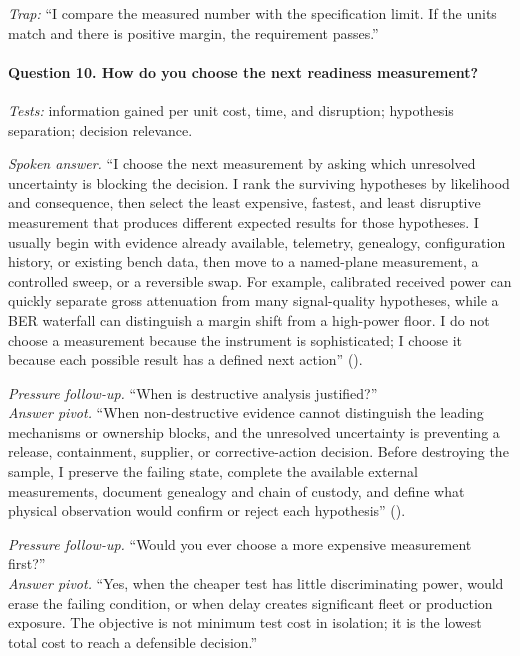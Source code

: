 \textit{Trap:} ``I compare the measured number with the specification limit. If
the units match and there is positive margin, the requirement passes.''

\paragraph{Question 10. How do you choose the next readiness measurement?}
\textit{Tests:} information gained per unit cost, time, and disruption;
hypothesis separation; decision relevance.

\textit{Spoken answer.}
``I choose the next measurement by asking which unresolved uncertainty is
blocking the decision. I rank the surviving hypotheses by likelihood and
consequence, then select the least expensive, fastest, and least disruptive
measurement that produces different expected results for those hypotheses. I
usually begin with evidence already available, telemetry, genealogy,
configuration history, or existing bench data, then move to a named-plane
measurement, a controlled sweep, or a reversible swap. For example, calibrated
received power can quickly separate gross attenuation from many signal-quality
hypotheses, while a BER waterfall can distinguish a margin shift from a
high-power floor. I do not choose a measurement because the instrument is
sophisticated; I choose it because each possible result has a defined next
action''
().

\textit{Pressure follow-up.} ``When is destructive analysis justified?''\\
\textit{Answer pivot.} ``When non-destructive evidence cannot distinguish the
leading mechanisms or ownership blocks, and the unresolved uncertainty is
preventing a release, containment, supplier, or corrective-action decision.
Before destroying the sample, I preserve the failing state, complete the
available external measurements, document genealogy and chain of custody, and
define what physical observation would confirm or reject each hypothesis''
().

\textit{Pressure follow-up.} ``Would you ever choose a more expensive
measurement first?''\\
\textit{Answer pivot.} ``Yes, when the cheaper test has little discriminating
power, would erase the failing condition, or when delay creates significant
fleet or production exposure. The objective is not minimum test cost in
isolation; it is the lowest total cost to reach a defensible decision.''


